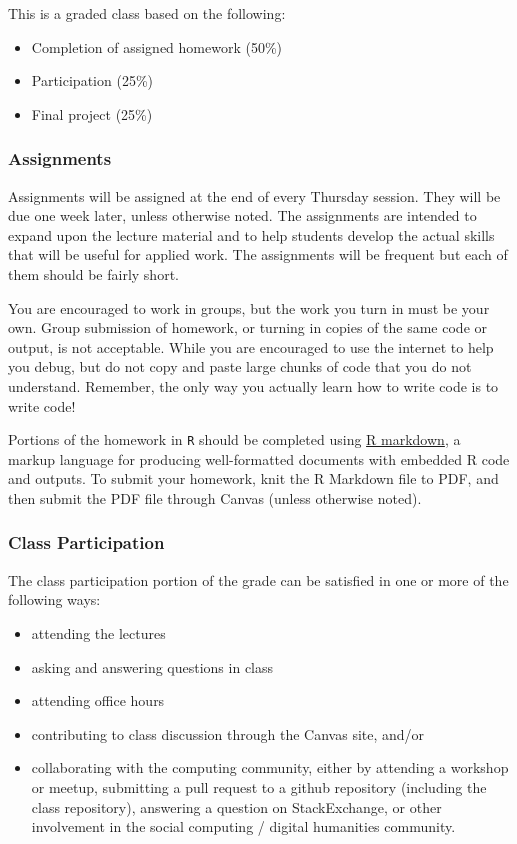 \documentclass[]{book}
\providecommand{\tightlist}{%
  \setlength{\itemsep}{0pt}\setlength{\parskip}{0pt}}
\begin{document}
This is a graded class based on the following:

\begin{itemize}
\tightlist
\item
  Completion of assigned homework (50\%)
\item
  Participation (25\%)
\item
  Final project (25\%)
\end{itemize}

\hypertarget{assignments}{%
\subsubsection*{Assignments}\label{assignments}}

Assignments will be assigned at the end of every Thursday session. They will be due one week later, unless otherwise noted. The assignments are intended to expand upon the lecture material and to help students develop the actual skills that will be useful for applied work. The assignments will be frequent but each of them should be fairly short.

You are encouraged to work in groups, but the work you turn in must be your own. Group submission of homework, or turning in copies of the same code or output, is not acceptable. While you are encouraged to use the internet to help you debug, but do not copy and paste large chunks of code that you do not understand. Remember, the only way you actually learn how to write code is to write code!

Portions of the homework in \texttt{R} should be completed using \href{https://rmarkdown.rstudio.com/}{R markdown}, a markup language for producing well-formatted documents with embedded R code and outputs. To submit your homework, knit the R Markdown file to PDF, and then submit the PDF file through Canvas (unless otherwise noted).

\hypertarget{class-participation}{%
\subsubsection*{Class Participation}\label{class-participation}}

The class participation portion of the grade can be satisfied in one or more of the following ways:

\begin{itemize}
\tightlist
\item
  attending the lectures
\item
  asking and answering questions in class
\item
  attending office hours
\item
  contributing to class discussion through the Canvas site, and/or
\item
  collaborating with the computing community, either by attending a workshop or meetup, submitting a pull request to a github repository (including the class repository), answering a question on StackExchange, or other involvement in the social computing / digital humanities community.
\end{itemize}
\end{document}
